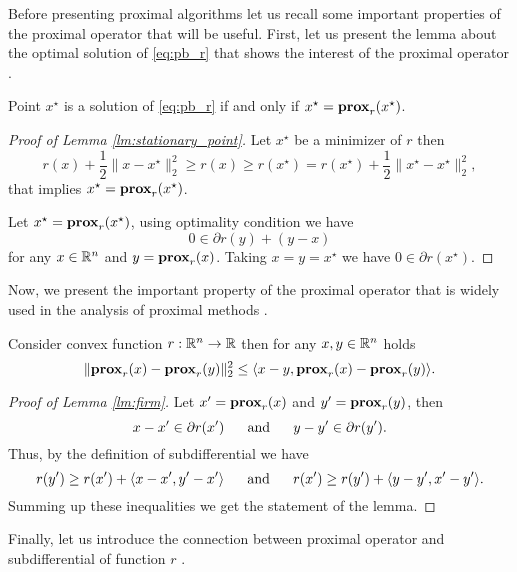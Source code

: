 {\color{blue} Before presenting proximal algorithms let us recall some important properties of the proximal operator that will be useful.
First, let us present the lemma about the optimal solution of \eqref{eq:pb_r} that shows the interest of the proximal operator \cite[Section $2.3$]{parikh2014proximal}.

\begin{lemma}\label{lm:stationary_point}
Point $x^\star$ is a solution of \eqref{eq:pb_r} if and only if $x^\star = \mathbf{prox}_r(x^\star)$.  
\end{lemma}
\begin{proof}[Proof of Lemma \ref{lm:stationary_point}]
Let $x^\star$ be a minimizer of $r$ then
$$
r(x) + \frac{1}{2}\|x-x^\star\|_2^2\geq r(x) \geq r(x^\star) = r(x^\star) + \frac{1}{2}\|x^\star - x^\star\|_2^2,
$$
that implies $x^\star = \mathbf{prox}_r(x^\star)$.

Let $x^\star = \mathbf{prox}_r(x^\star)$, using optimality condition we have 
$$
0\in \partial r(y) + (y-x)
$$
for any $x\in\mathbb{R}^n$ and $y=\mathbf{prox}_r(x)$.
Taking $x=y = x^\star$ we have $0\in\partial r(x^\star)$.
\end{proof}

Now, we present the important property of the proximal operator that is widely used in the analysis of proximal methods \cite[Prop. ~12.27]{bauschke2011convex}.
\begin{lemma}\label{lm:firm}
Consider convex function $r:\mathbb{R}^n\rightarrow \mathbb{R}$ then for any $x, y\in \mathbb{R}^n$ holds
\begin{equation}\label{eq:firm}
\|\mathbf{prox}_r(x)-\mathbf{prox}_r(y)\|_2^2\leq\langle x-y, \mathbf{prox}_r(x)-\mathbf{prox}_r(y)\rangle.
\end{equation}
\end{lemma}
\begin{proof}[Proof of Lemma \ref{lm:firm}]
Let $x^\prime = \mathbf{prox}_r(x)$ and $y^\prime = \mathbf{prox}_r(y)$, then 
$$
x - x^\prime\in\partial r(x^\prime)~~~~~\textnormal{and}~~~~~y - y^\prime \in\partial r(y^\prime).
$$
Thus, by the definition of subdifferential we have 
$$
r(y^\prime)\geq r(x^\prime) + \langle x - x^\prime, y^\prime- x^\prime\rangle~~~~~\textnormal{and}~~~~~r(x^\prime)\geq r(y^\prime) + \langle y - y^\prime, x^\prime- y^\prime\rangle.
$$
Summing up these inequalities we get the statement of the lemma.
\end{proof}

Finally, let us introduce the connection between proximal operator and subdifferential of function $r$ \cite{parikh2014proximal}.

}
